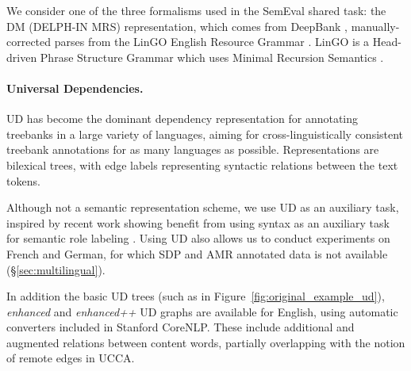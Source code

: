 \documentclass[11pt,a4paper]{article}
\begin{document}
We consider one of the three formalisms used in the SemEval shared task:
the DM (DELPH-IN MRS) representation, which comes
from DeepBank \cite{flickinger2012deepbank},
manually-corrected parses from the LinGO
English Resource Grammar \cite{copestake2000open}.
LinGO is a Head-driven Phrase
Structure Grammar \cite[HPSG; ][]{pollard1994head}
which uses Minimal Recursion Semantics \cite{copestake2005minimal}.

\paragraph{Universal Dependencies.}\label{sec:ud}

UD \cite{nivre2016universal,11234/1-2515} has become
the dominant dependency representation for
annotating treebanks in a large variety of languages,
aiming for cross-linguistically consistent treebank
annotations for as many languages as possible.
Representations are bilexical trees, with edge labels representing
syntactic relations between the text tokens.

Although not a semantic representation scheme,
we use UD as an auxiliary task,
inspired by recent work showing benefit from using syntax as an auxiliary task for semantic role labeling
\cite[][]{swayamdipta2017frame}.
Using UD also allows us to conduct experiments on French and German, for which SDP and AMR
annotated data is not available (\S\ref{sec:multilingual}).

In addition the basic UD trees (such as in Figure~\ref{fig:original_example_ud}),
\textit{enhanced} and \textit{enhanced++} UD graphs are available for English,
using automatic converters included in Stanford CoreNLP.
These include additional and augmented relations between content words,
partially overlapping with the notion of remote edges in UCCA.
\end{document}
